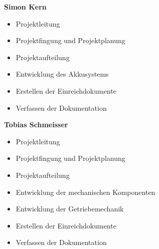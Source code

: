 \newpage

\textbf{Simon Kern}
\begin{itemize}
	\item Projektleitung
	\item Projektfingung und Projektplanung
	\item Projektaufteilung
	\item Entwicklung des Akkusystems
	\item Erstellen der Einreichdokumente
	\item Verfassen der Dokumentation
\end{itemize}
\bigskip

\textbf{Tobias Schmeisser}
\begin{itemize}
	\item Projektleitung
	\item Projektfingung und Projektplanung
	\item Projektaufteilung
	\item Entwicklung der mechanischen Komponenten
	\item Entwicklung der Getriebemechanik
	\item Erstellen der Einreichdokumente	
	\item Verfassen der Dokumentation
\end{itemize}